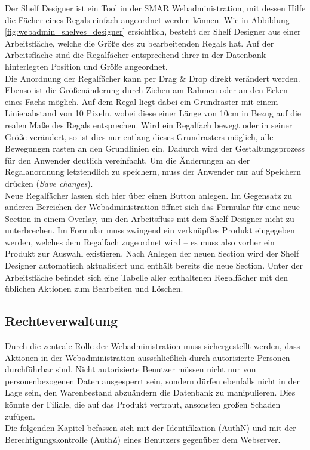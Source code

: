 Der Shelf Designer ist ein Tool in der \acs{SMAR} Webadministration, mit dessen Hilfe die Fächer eines Regals einfach angeordnet werden können. Wie in Abbildung \ref{fig:webadmin_shelves_designer} ersichtlich, besteht der Shelf Designer aus einer Arbeitsfläche, welche die Größe des zu bearbeitenden Regals hat. Auf der Arbeitsfläche sind die Regalfächer entsprechend ihrer in der Datenbank hinterlegten Position und Größe angeordnet.\\

Die Anordnung der Regalfächer kann per Drag \& Drop direkt verändert werden. Ebenso ist die Größenänderung durch Ziehen am Rahmen oder an den Ecken eines Fachs möglich. Auf dem Regal liegt dabei ein Grundraster mit einem Linienabstand von 10 Pixeln, wobei diese einer Länge von 10cm in Bezug auf die realen Maße des Regals entsprechen. Wird ein Regalfach bewegt oder in seiner Größe verändert, so ist dies nur entlang dieses Grundrasters möglich, alle Bewegungen rasten an den Grundlinien ein. Dadurch wird der Gestaltungsprozess für den Anwender deutlich vereinfacht. Um die Änderungen an der Regalanordnung letztendlich zu speichern, muss der Anwender nur auf Speichern drücken (\emph{Save changes}).\\

Neue Regalfächer lassen sich hier über einen Button anlegen. Im Gegensatz zu anderen Bereichen der Webadministration öffnet sich das Formular für eine neue  Section in einem Overlay, um den Arbeitsfluss mit dem Shelf Designer nicht zu unterbrechen. Im Formular muss zwingend ein verknüpftes Produkt eingegeben werden, welches dem Regalfach zugeordnet wird -- es muss also vorher ein Produkt zur Auswahl existieren. Nach Anlegen der neuen Section wird der Shelf Designer automatisch aktualisiert und enthält bereits die neue Section. Unter der Arbeitsfläche befindet sich eine Tabelle aller enthaltenen Regalfächer mit den üblichen Aktionen zum Bearbeiten und Löschen.\\


\subsection{Rechteverwaltung}
\label{cha:rechteverwaltung_web}
Durch die zentrale Rolle der Webadministration muss sichergestellt werden, dass Aktionen in der Webadministration ausschließlich durch autorisierte Personen durchführbar sind. Nicht autorisierte Benutzer müssen nicht nur von personenbezogenen Daten ausgesperrt sein, sondern dürfen ebenfalls nicht in der Lage sein, den Warenbestand abzuändern \bzw die Datenbank zu manipulieren. Dies könnte der Filiale, die auf das Produkt vertraut, ansonsten großen Schaden zufügen.\\
Die folgenden Kapitel befassen sich mit der Identifikation (\acs{AuthN}) und mit der Berechtigungskontrolle (\acs{AuthZ}) eines Benutzers gegenüber dem Webserver.

